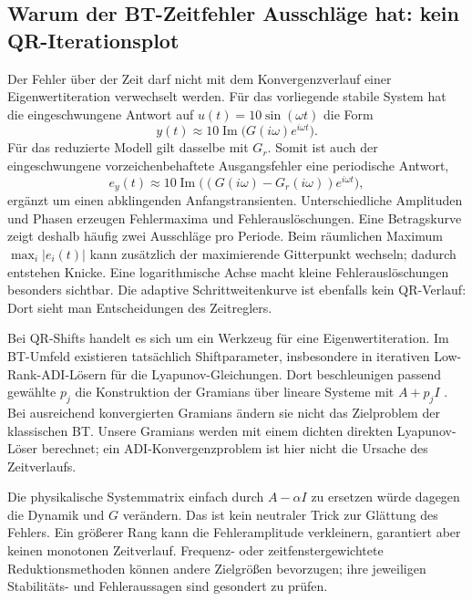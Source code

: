 \subsection{Warum der BT-Zeitfehler Ausschläge hat: kein QR-Iterationsplot}
Der Fehler über der Zeit darf nicht mit dem Konvergenzverlauf einer Eigenwertiteration verwechselt werden. Für das vorliegende stabile System hat die eingeschwungene Antwort auf $u(t)=10\sin(\omega t)$ die Form
\begin{equation}
 y(t)\approx 10\operatorname{Im}\bigl(G(i\omega)e^{i\omega t}\bigr).
\end{equation}
Für das reduzierte Modell gilt dasselbe mit $G_r$. Somit ist auch der eingeschwungene vorzeichenbehaftete Ausgangsfehler eine periodische Antwort,
\begin{equation}
 e_y(t)\approx10\operatorname{Im}\bigl((G(i\omega)-G_r(i\omega))e^{i\omega t}\bigr),
\end{equation}
ergänzt um einen abklingenden Anfangstransienten. Unterschiedliche Amplituden und Phasen erzeugen Fehlermaxima und Fehlerauslöschungen. Eine Betragskurve zeigt deshalb häufig zwei Ausschläge pro Periode. Beim räumlichen Maximum $\max_i|e_i(t)|$ kann zusätzlich der maximierende Gitterpunkt wechseln; dadurch entstehen Knicke. Eine logarithmische Achse macht kleine Fehlerauslöschungen besonders sichtbar. Die adaptive Schrittweitenkurve ist ebenfalls kein QR-Verlauf: Dort sieht man Entscheidungen des Zeitreglers.

Bei QR-Shifts handelt es sich um ein Werkzeug für eine Eigenwertiteration. Im BT-Umfeld existieren tatsächlich Shiftparameter, insbesondere in iterativen Low-Rank-ADI-Lösern für die Lyapunov-Gleichungen. Dort beschleunigen passend gewählte $p_j$ die Konstruktion der Gramians über lineare Systeme mit $A+p_jI$ \cite{adi}. Bei ausreichend konvergierten Gramians ändern sie nicht das Zielproblem der klassischen BT. Unsere Gramians werden mit einem dichten direkten Lyapunov-Löser berechnet; ein ADI-Konvergenzproblem ist hier nicht die Ursache des Zeitverlaufs.

Die physikalische Systemmatrix einfach durch $A-\alpha I$ zu ersetzen würde dagegen die Dynamik und $G$ verändern. Das ist kein neutraler Trick zur Glättung des Fehlers. Ein größerer Rang kann die Fehleramplitude verkleinern, garantiert aber keinen monotonen Zeitverlauf. Frequenz- oder zeitfenstergewichtete Reduktionsmethoden können andere Zielgrößen bevorzugen; ihre jeweiligen Stabilitäts- und Fehleraussagen sind gesondert zu prüfen.

